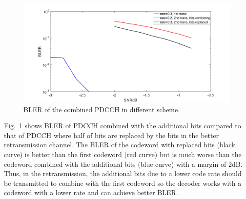 \documentclass[conference,10pt]{IEEEtran}
\begin{document}

\begin{figure}[htbp]
\centerline{\includegraphics[scale=0.2]{fig9.png}}
\caption{BLER of the combined PDCCH in different scheme.}
\label{fig9}
\end{figure}

Fig.~\ref{fig9} shows BLER of PDCCH combined with the additional bits compared to that of PDCCH where half of bits are replaced by the bits in the better retransmission channel. The BLER of the codeword with replaced bits (black curve) is better than the first codeword (red curve) but is much worse than the codeword combined  with the additional bits (blue curve) with a margin of 2dB. Thus, in the retransmission, the additional bits due to a lower code rate should be transmitted to combine with the first codeword so the decoder works with a codeword with a lower rate and can achieve better BLER.
\end{document}
